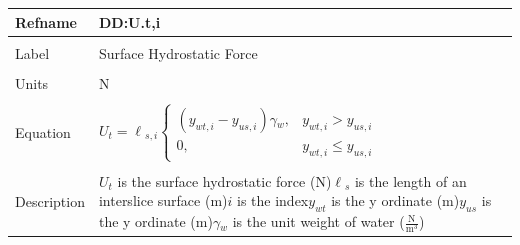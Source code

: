 \documentclass[12pt]{article}
\begin{document}
\noindent \begin{minipage}{\textwidth}
\begin{tabular}{p{} p{}}
\toprule \textbf{Refname} & \textbf{DD:U.t,i}
\label{DD:U.t,i}
\\ \midrule \\
Label & Surface Hydrostatic Force
\\ \midrule \\
Units & N
\\ \midrule \\
Equation & ${U_{t}}={\ell{}_{s,i}} \begin{cases}
\left({y_{wt,i}}-{y_{us,i}}\right) {\gamma{}_{w}}, & {y_{wt,i}}>{y_{us,i}}\\
0, & {y_{wt,i}}\leq{}{y_{us,i}}
\end{cases}$
\\ \midrule \\
Description & ${U_{t}}$ is the surface hydrostatic force (N)\newline${\ell{}_{s}}$ is the length of an interslice surface (m)\newline$i$ is the index\newline${y_{wt}}$ is the y ordinate (m)\newline${y_{us}}$ is the y ordinate (m)\newline${\gamma{}_{w}}$ is the unit weight of water ($\frac{\text{N}}{\text{m}^{3}}$)
\\ \bottomrule \end{tabular}
\end{minipage}\\
~\newline
\end{document}
